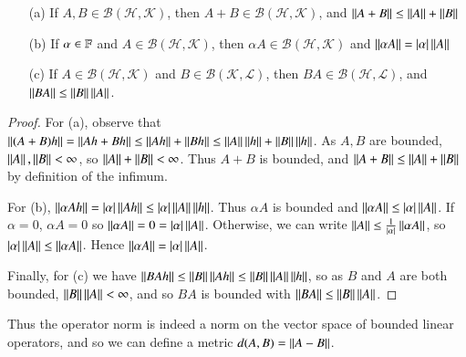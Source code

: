 \begin{prop}
    \begin{enumerate}
        \item[(a)] If $A,B \in \mathscr{B}(\mathscr{H},\mathscr{K})$, then $A+B \in \mathscr{B}(\mathscr{H},\mathscr{K})$, and $\norm{A+B}\leq \norm{A}+\norm{B}$
        \item[(b)] If $\alpha \in \F$ and $A \in \mathscr{B}(\mathscr{H},\mathscr{K})$, then $\alpha A \in \mathscr{B}(\mathscr{H},\mathscr{K})$ and $\norm{\alpha A} = |\alpha|\norm{A}$
        \item[(c)] If $A \in \mathscr{B}(\mathscr{H},\mathscr{K})$ and $B \in \mathscr{B}(\mathscr{K},\mathscr{L})$, then $BA \in \mathscr{B}(\mathscr{H},\mathscr{L})$, and $\norm{BA} \leq \norm{B}\norm{A}$.
    \end{enumerate}
\end{prop}
\begin{proof}
    For (a), observe that $\norm{(A+B)h} = \norm{Ah+Bh} \leq \norm{Ah}+\norm{Bh} \leq \norm{A}\norm{h}+\norm{B}\norm{h}$. As $A,B$ are bounded, $\norm{A},\norm{B} < \infty$, so $\norm{A}+\norm{B} < \infty$. Thus $A+B$ is bounded, and $\norm{A+B} \leq \norm{A}+\norm{B}$ by definition of the infimum.

    For (b), $\norm{\alpha Ah} = |\alpha|\norm{Ah} \leq |\alpha|\norm{A}\norm{h}$. Thus $\alpha A$ is bounded and $\norm{\alpha A} \leq |\alpha|\norm{A}$. If $\alpha = 0$, $\alpha A = 0$ so $\norm{\alpha A} = 0 = |\alpha|\norm{A}$. Otherwise, we can write $\norm{A} \leq \frac{1}{|\alpha|}\norm{\alpha A}$, so $|\alpha|\norm{A}\leq \norm{\alpha A}$. Hence $\norm{\alpha A} = |\alpha|\norm{A}$.

    Finally, for (c) we have $\norm{BAh} \leq \norm{B}\norm{Ah} \leq \norm{B}\norm{A}\norm{h}$, so as $B$ and $A$ are both bounded, $\norm{B}\norm{A} < \infty$, and so $BA$ is bounded with $\norm{BA} \leq \norm{B}\norm{A}$.
\end{proof}


Thus the operator norm is indeed a norm on the vector space of bounded linear operators, and so we can define a metric $d(A,B) = \norm{A-B}$.

